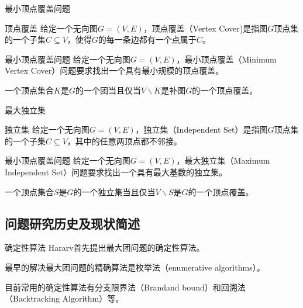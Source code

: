 \documentclass[9pt,dvipsnames,table,UTF8,aspectratio=169]{beamer}
\begin{document}
\begin{frame}{最小顶点覆盖问题}
	\begin{definition}{顶点覆盖}
		给定一个无向图$G = (V,E)$，顶点覆盖（Vertex Cover)是指图$G$顶点集的一个子集$C \subseteq V$，使得$G$的每一条边都有一个点属于$C$。
	\end{definition}

	\begin{definition}{最小顶点覆盖问题}
		给定一个无向图$G = (V,E)$，最小顶点覆盖（Minimum Vertex Cover）问题要求找出一个具有最小规模的顶点覆盖。
	\end{definition}

	一个顶点集合$K$是$G$的一个团当且仅当$V \backslash K$是补图$G$的一个顶点覆盖。
\end{frame}

\begin{frame}{最大独立集}
	\begin{definition}{独立集}
		给定一个无向图$G = (V,E)$，独立集（Independent Set）是指图$G$顶点集的一个子集$C \subseteq V$，其中的任意两顶点都不邻接。
	\end{definition}

	\begin{definition}{最小顶点覆盖问题}
		给定一个无向图$G = (V,E)$，最大独立集（Maximum Independent Set）问题要求找出一个具有最大基数的独立集。
	\end{definition}

	一个顶点集合$S$是$G$的一个独立集当且仅当$V \backslash S$是$G$的一个顶点覆盖。
\end{frame}

\subsection{问题研究历史及现状简述}
\begin{frame}{确定性算法}
	Hararv首先提出最大团问题的确定性算法\footnotemark。

	最早的解决最大团问题的精确算法是枚举法（enumerative algorithms）。

	目前常用的确定性算法有分支限界法（Brandand  bound）\footnotemark 和回溯法（Backtracking  Algorithm）等。

\end{frame}
\end{document}

